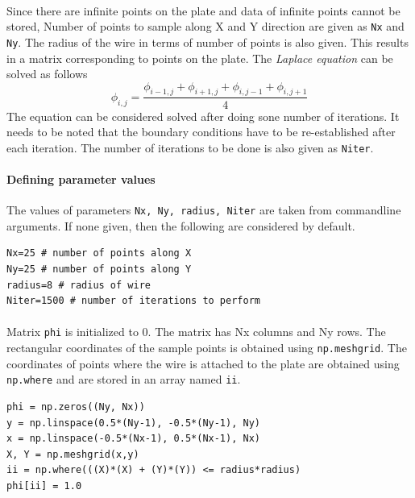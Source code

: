 \documentclass[12pt, a4paper]{article}
\begin{document}
\paragraph*{}
Since there are infinite points on the plate and data of infinite points cannot be stored, Number of points to sample along X and Y direction are given as  \texttt{Nx} and \texttt{Ny}. The radius of the wire in terms of number of points is also given. This results in a matrix corresponding to points on the plate. The \textit{Laplace equation} can be solved as follows
\begin{equation*}
\phi_{i,j} = \frac{\phi_{i-1,j} + \phi_{i+1,j} + \phi_{i, j-1} + \phi_{i, j+1}}{4}
\end{equation*}
The equation can be considered solved after doing sone number of iterations. It needs to be noted that the boundary conditions have to be re-established after each iteration. The number of iterations to be done is also given as \texttt{Niter}.

\paragraph*{Defining parameter values\\}
The values of parameters \texttt{Nx, Ny, radius, Niter} are taken from commandline arguments. If none given, then the following are considered by default.

\begin{lstlisting}
Nx=25 # number of points along X
Ny=25 # number of points along Y
radius=8 # radius of wire
Niter=1500 # number of iterations to perform
\end{lstlisting}

\paragraph*{}
Matrix \texttt{phi} is initialized to 0. The matrix has Nx columns and Ny rows. The rectangular coordinates of the sample points is obtained using \texttt{np.meshgrid}. The coordinates of points where the wire is attached to the plate are obtained using \texttt{np.where} and are stored in an array named \texttt{ii}.

\begin{lstlisting}
phi = np.zeros((Ny, Nx))
y = np.linspace(0.5*(Ny-1), -0.5*(Ny-1), Ny)
x = np.linspace(-0.5*(Nx-1), 0.5*(Nx-1), Nx)
X, Y = np.meshgrid(x,y)
ii = np.where(((X)*(X) + (Y)*(Y)) <= radius*radius)
phi[ii] = 1.0
\end{lstlisting}
\end{document}
